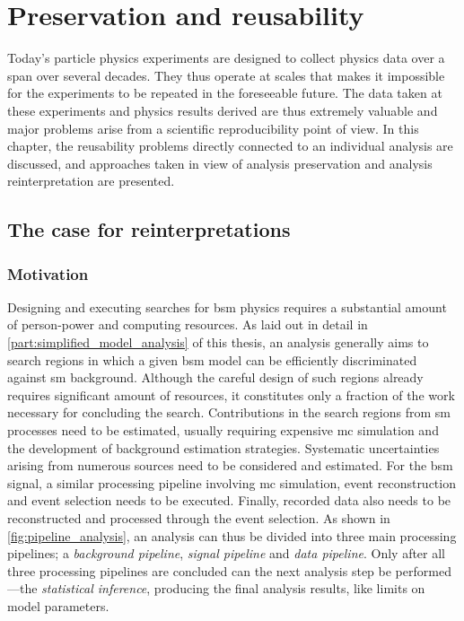 
\chapter{Preservation and reusability}\label{ch:preservation}

\ifpdf
    \graphicspath{{chapter-preservation/Figs/Raster/}{chapter-preservation/Figs/PDF/}{chapter-preservation/Figs/}}
\else
    \graphicspath{{chapter-preservation/Figs/Vector/}{chapter-preservation/Figs/}}
\fi

Today's particle physics experiments are designed to collect physics data over a span over several decades. They thus operate at scales that makes it impossible for the experiments to be repeated in the foreseeable future. The data taken at these experiments and physics results derived are thus extremely valuable and major problems arise from a scientific reproducibility point of view. In this chapter, the reusability problems directly connected to an individual analysis are discussed, and approaches taken in view of analysis preservation and analysis reinterpretation are presented.

\section{The case for reinterpretations}\label{sec:reinterpretations}

\subsection{Motivation}
Designing and executing searches for \gls{bsm} physics requires a substantial amount of person-power and computing resources. As laid out in detail in \cref{part:simplified_model_analysis} of this thesis, an analysis generally aims to search regions in which a given \gls{bsm} model can be efficiently discriminated against \gls{sm} background. Although the careful design of such regions already requires significant amount of resources, it constitutes only a fraction of the work necessary for concluding the search. 
Contributions in the search regions from \gls{sm} processes need to be estimated, usually requiring expensive \gls{mc} simulation and the development of background estimation strategies. Systematic uncertainties arising from numerous sources need to be considered and estimated. 
For the \gls{bsm} signal, a similar processing pipeline involving \gls{mc} simulation, event reconstruction and event selection needs to be executed. Finally, recorded data also needs to be reconstructed and processed through the event selection. As shown in \cref{fig:pipeline_analysis}, an analysis can thus be divided into three main processing pipelines; a \textit{background pipeline}, \textit{signal pipeline} and \textit{data pipeline}. Only after all three processing pipelines are concluded can the next analysis step be performed---the \textit{statistical inference}, producing the final analysis results, like \eg limits on model parameters.

